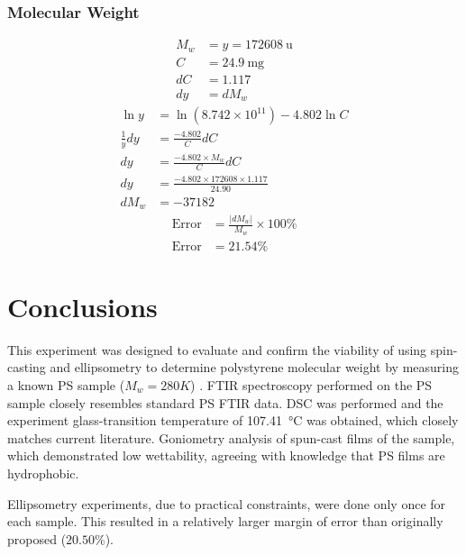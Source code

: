 \documentclass[twocolumn]{article}
\begin{document}
                \subsubsection{Molecular Weight}
                    \begin{align}
                        M_w &= y = \qty{172608}{\atomicmassunit} \nonumber\\
                        C &= \qty{24.9}{\milli\gram} \nonumber\\
                        dC &= 1.117 \nonumber\\
                        dy &= dM_w \nonumber
                    \end{align}
                    \begin{align}
                        \ln y &= \ln{(8.742 \times 10^{11})} - 4.802 \ln{C}\\
                        \frac{1}{y}dy &= \frac{-4.802}{C}dC \nonumber\\
                        dy &= \frac{-4.802 \times M_w}{C}dC \nonumber\\
                        dy &= \frac{-4.802 \times 172608 \times 1.117}{24.90} \nonumber\\
                        dM_w &= - 37182 \nonumber
                    \end{align}
                    \begin{align}
                        \text{Error} &= \frac{|dM_w|}{M_w} \times 100\%\\
                        \text{Error} &= 21.54\% \nonumber
                    \end{align}
        \section{Conclusions}
            This experiment was designed to evaluate and confirm the viability of using spin-casting and ellipsometry to determine polystyrene molecular weight by measuring a known PS sample ($M_w = 280K$) . FTIR spectroscopy performed on the PS sample closely resembles standard PS FTIR data. DSC was performed and the experiment glass-transition temperature of \qty{107.41}{\degreeCelsius} was obtained, which closely matches current literature. Goniometry analysis of spun-cast films of the sample, which demonstrated low wettability, agreeing with knowledge that PS films are hydrophobic.

            Ellipsometry experiments, due to practical constraints, were done only once for each sample. This resulted in a relatively larger margin of error than originally proposed ($20.50\%$). 
            
\end{document}

